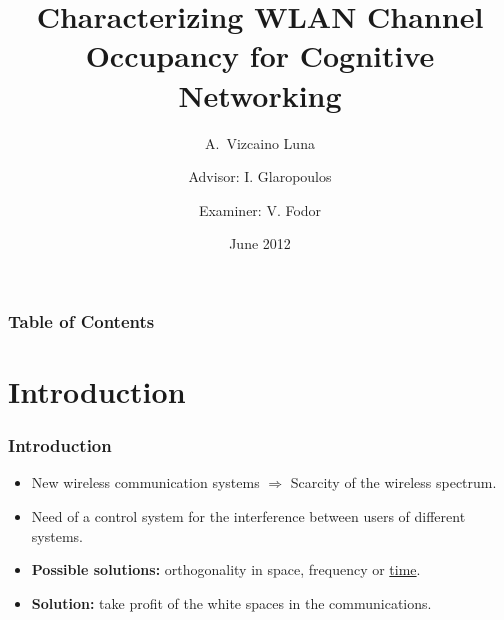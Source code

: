 \documentclass[9pt,handout,serif]{beamer}
\title[Characterizing WLAN Channel Occupancy
for Cognitive Networking]%
{\textbf{Characterizing WLAN Channel Occupancy
for Cognitive Networking}}
\author[Vizcaino Luna, A.] %
{A.~Vizcaino Luna \and \linebreak \linebreak Advisor: I. Glaropoulos \and \linebreak Examiner: V. Fodor}
\institute[Kungliga Tekniska Högskolan] %
{
  School of Electrical Engineering\\
  Kungliga Tekniska Högskolan
}
\date[2012] %
{June 2012}
\begin{document}
\begin{frame}
	\titlepage
\end{frame}

\begin{frame}
	\frametitle{Table of Contents}
	\scriptsize
	\tableofcontents
\end{frame}

\section{Introduction}

\begin{frame}[c]
	\frametitle{Introduction}
	\begin{itemize}
		\item New wireless communication systems $\Rightarrow$ Scarcity of the wireless spectrum.
		\item Need of a control system for the interference between users of different systems.
		\item \textbf{Possible solutions:} orthogonality in space, frequency or \underline{time}.
		\item \textbf{Solution:} take profit of the white spaces in the communications.
	\end{itemize}
\end{frame}
\end{document}
